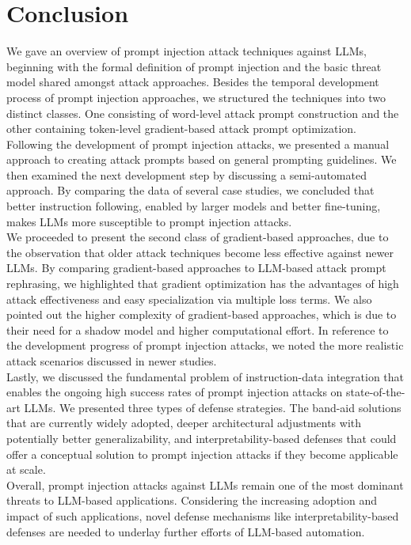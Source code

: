 \section{Conclusion}
We gave an overview of prompt injection attack techniques against LLMs, beginning with the formal definition of prompt injection and the basic threat model shared amongst attack approaches.
Besides the temporal development process of prompt injection approaches, we structured the techniques into two distinct classes.
One consisting of word-level attack prompt construction and the other containing token-level gradient-based attack prompt optimization.\\

Following the development of prompt injection attacks, we presented a manual approach to creating attack prompts based on general prompting guidelines.
We then examined the next development step by discussing a semi-automated approach.
By comparing the data of several case studies, we concluded that better instruction following, enabled by larger models and better fine-tuning, makes LLMs more susceptible to prompt injection attacks.\\

We proceeded to present the second class of gradient-based approaches, due to the observation that older attack techniques become less effective against newer LLMs.
By comparing gradient-based approaches to LLM-based attack prompt rephrasing, we highlighted that gradient optimization has the advantages of high attack effectiveness and easy specialization via multiple loss terms.
We also pointed out the higher complexity of gradient-based approaches, which is due to their need for a shadow model and higher computational effort.
In reference to the development progress of prompt injection attacks, we noted the more realistic attack scenarios discussed in newer studies.\\

Lastly, we discussed the fundamental problem of instruction-data integration that enables the ongoing high success rates of prompt injection attacks on state-of-the-art LLMs.
We presented three types of defense strategies.
The band-aid solutions that are currently widely adopted, deeper architectural adjustments with potentially better generalizability, and interpretability-based defenses that could offer a conceptual solution to prompt injection attacks if they become applicable at scale.\\

Overall, prompt injection attacks against LLMs remain one of the most dominant threats to LLM-based applications.
Considering the increasing adoption and impact of such applications, novel defense mechanisms like interpretability-based defenses are needed to underlay further efforts of LLM-based automation.